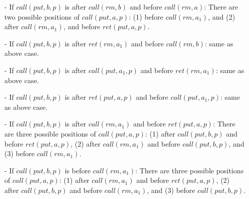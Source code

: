 \begin{itemize}
\setlength{\itemsep}{0.5pt}
\item[-] If $\textit{call}(\textit{put},b,p)$ is after $\textit{call}(\textit{rm},b)$ and before $\textit{call}(\textit{rm},a)$: There are two possible positions of $\textit{call}(\textit{put},a,p)$: (1) before $\textit{call}(\textit{rm},a_1)$, and (2) after $\textit{call}(\textit{rm},a_1)$, and before $\textit{ret}(\textit{put},a,p)$.

\item[-] If $\textit{call}(\textit{put},b,p)$ is after $\textit{ret}(\textit{rm},a_1)$ and before $\textit{call}(\textit{rm},b)$: same as above case.

\item[-] If $\textit{call}(\textit{put},b,p)$ is after $\textit{call}(\textit{put},a_1,p)$ and before $\textit{ret}(\textit{rm},a_1)$: same as above case.

\item[-] If $\textit{call}(\textit{put},b,p)$ is after $\textit{ret}(\textit{put},a,p)$ and before $\textit{call}(\textit{put},a_1,p)$: same as above case.

\item[-] If $\textit{call}(\textit{put},b,p)$ is after $\textit{call}(\textit{rm},a_1)$ and before $\textit{ret}(\textit{put},a,p)$: There are three possible positions of $\textit{call}(\textit{put},a,p)$: (1) after $\textit{call}(\textit{put},b,p)$ and before $\textit{ret}(\textit{put},a,p)$, (2) after $\textit{call}(\textit{rm},a_1)$ and before $\textit{call}(\textit{put},b,p)$, and (3) before $\textit{call}(\textit{rm},a_1)$.

\item[-] If $\textit{call}(\textit{put},b,p)$ is before $\textit{call}(\textit{rm},a_1)$: There are three possible positions of $\textit{call}(\textit{put},a,p)$: (1) after $\textit{call}(\textit{rm},a_1)$ and before $\textit{ret}(\textit{put},a,p)$, (2) after $\textit{call}(\textit{put},b,p)$ and before $\textit{call}(\textit{rm},a_1)$, and (3) before $\textit{call}(\textit{put},b,p)$.
\end{itemize}

